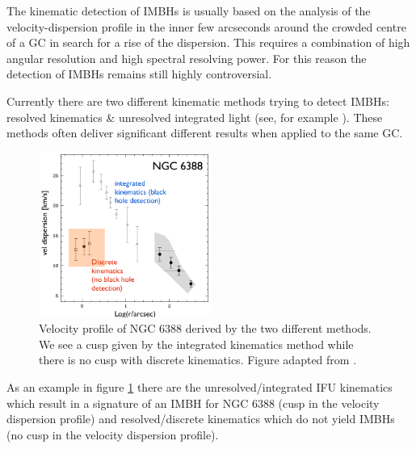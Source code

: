 \par The kinematic detection of \acp{IMBH} is usually based on the analysis of the velocity-dispersion profile in the inner few arcseconds around the crowded centre of a \ac{GC} in search for a rise of the dispersion. This requires a combination of high angular resolution and high spectral resolving power. For this reason the detection of \acp{IMBH} remains still highly controversial. 
\par Currently there are two different kinematic methods trying to detect \acp{IMBH}: resolved kinematics \& unresolved integrated light (see, for example \citealt{2015MNRAS.453..365B}). These methods often deliver significant different results when applied to the same \ac{GC}.
\begin{figure}[htbp]
\centering
\includegraphics[width=0.5\textwidth]{Plots/Paolo_talk_plot.png}
\caption{Velocity profile of NGC 6388 derived by the two different methods. We see a cusp given by the integrated kinematics method while there is no cusp with discrete kinematics. Figure adapted from \citet{2013ApJ...769..107L} .}
\label{fig:NGC6388}
\end{figure}
 As an example in figure \ref{fig:NGC6388} there are the unresolved/integrated IFU kinematics which result in a signature of an \ac{IMBH} for NGC 6388 (cusp in the velocity dispersion profile) \citep{2011A&A...533A..36L} and resolved/discrete kinematics which do not yield \acp{IMBH} (no cusp in the velocity dispersion profile)\citep{2013ApJ...769..107L}. 

